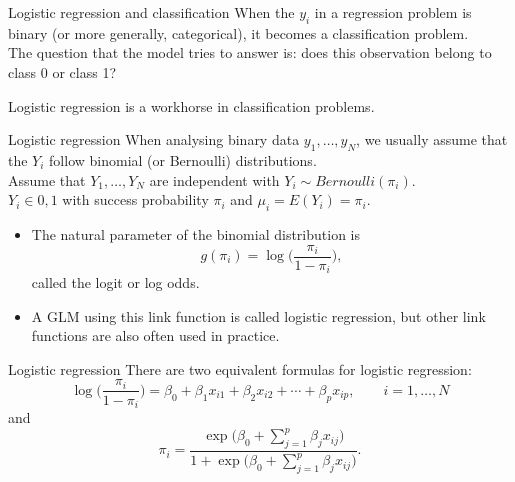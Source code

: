 \documentclass[10pt,handout]{beamer}
\begin{document}
\begin{frame}{Logistic regression and classification}
When the $y_i$ in a regression problem is binary (or more generally, categorical), it becomes a {\color{uured}classification problem}.\\[3mm]\pause
The question that the model tries to answer is: does this observation belong to class 0 or class 1?\\[3mm]\pause

Logistic regression is a workhorse in classification problems.


\end{frame}




\begin{frame}{Logistic regression}
When analysing binary data $y_1,\ldots,y_N$, we usually assume that the $Y_i$ follow binomial (or Bernoulli) distributions.\\[3mm ]\pause
Assume that $Y_1,\ldots,Y_N$ are independent with $Y_i \sim Bernoulli(\pi_i)$.\\[3mm ]\pause
$Y_i \in {0,1}$ with success probability $\pi_i$ and $\mu_i=E(Y_i)=\pi_i$.\\[3mm ]\pause
\begin{itemize}
\item The natural parameter of the binomial distribution is $$g(\pi_i)=\log\Big(\frac{\pi_i}{1-\pi_i}\Big),$$
called the {\color{uured}logit} or {\color{uured}log odds}.\\[3mm ]\pause
\item A GLM using this link function is called {\color{uured}logistic regression}, but other link functions are also often used in practice.\\[3mm]
\end{itemize}
\end{frame}


\begin{frame}{Logistic regression}
There are two equivalent formulas for {\color{uured}logistic regression}:
$$\log\Big(\frac{\pi_i}{1-\pi_i}\Big)=\beta_0+\beta_1 x_{i1}+\beta_2 x_{i2}+\cdots+\beta_p x_{ip},\qquad i=1,\ldots,N$$
and
$$\pi_i=\frac{\exp\Big(\beta_0+\sum_{j=1}^p\beta_jx_{ij}\Big)}{1+\exp\Big(\beta_0+\sum_{j=1}^p\beta_jx_{ij}\Big)}.$$
\end{frame}
\end{document}
